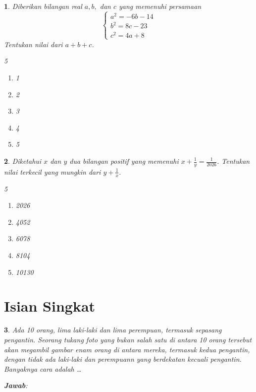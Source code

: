 \documentclass[11pt,a4paper,DIV=12]{scrartcl}
\newcommand\answerbox{%
\vspace*{0.5cm}%
\noindent\textbf{\textsf{Jawab}}: \fbox{\rule{14cm}{0pt}\rule[-0.2ex]{0pt}{1.9ex}}}
\theoremstyle{problemstyle}
\newtheorem{problem}{}
\theoremstyle{answerstyle}
\begin{document}
\begin{problem}
  Diberikan bilangan real $a, b,$ dan $c$ yang memenuhi persamaan
  \[
    \begin{cases}
      a^2 = -6b - 14 \\
      b^2 = 8c - 23  \\
      c^2 = 4a + 8
    \end{cases}
  \]
  Tentukan nilai dari $a + b + c$.
  \begin{multicols}{5}
    \begin{enumerate}[label=(\Alph*)]
      \item 1
      \item 2
      \item 3
      \item 4
      \item 5
    \end{enumerate}
  \end{multicols}
\end{problem}

\begin{problem}
  Diketahui $x$ dan $y$ dua bilangan positif yang memenuhi $x + \frac{1}{y} = \frac{1}{2026}$. Tentukan nilai terkecil yang mungkin dari $y + \frac{1}{x}$.
  \begin{multicols}{5}
    \begin{enumerate}[label=(\Alph*)]
      \item 2026
      \item 4052
      \item 6078
      \item 8104
      \item 10130
    \end{enumerate}
  \end{multicols}
\end{problem}


\section*{Isian Singkat}
\begin{problem}
  Ada 10 orang, lima laki-laki dan lima perempuan, termasuk sepasang
  pengantin. Seorang tukang foto yang bukan salah satu di antara 10 orang
  tersebut akan megambil gambar enam orang di antara mereka, termasuk kedua pengantin, dengan tidak ada laki-laki dan perempuann yang
  berdekatan kecuali pengantin. Banyaknya cara adalah \ldots

  \answerbox
\end{problem}
\end{document}
